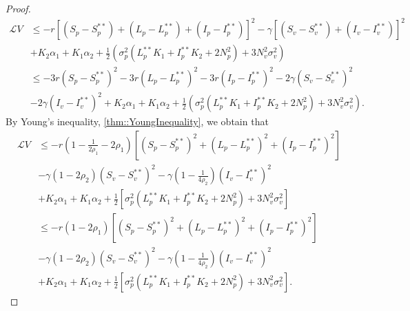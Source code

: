 \begin{proof}
	\begin{align*}
		\mathcal{L}V 
			&\leq 
				-r 
				\left[
					(S_p - S_p ^{**}) + 
					(L_p - L_p ^{**}) +
					(I_p - I_p ^{**})
				\right]^2 - 
				\gamma 
				\left[
					(S_v - S_v^{**}) + 
					(I_v - I_v^{**})
				\right] ^ 2
				\\
			&+
				K_2 \alpha_1 + 
				K_1 \alpha_2 + 
				\frac{1}{2}
				\left(
					\sigma_p ^2 
					(
						L_p ^{**} K_1 + 
						I_p ^{**} K_2 + 
						2 N_p ^ 2
					) + 3 N_v ^ 2 
					\sigma_v ^ 2
				\right)
				\\
			&\leq 
				-3r 
				(S_p - S_p ^{**}) ^ 2 - 
				3r 
				(L_p - L_p ^{**}) ^2 - 
				3r
				(I_p - I_p ^{**}) ^ 2 - 
				2 \gamma 
				(S_v - S_v^{**}) ^ 2 
				\\
			&- 
				2 \gamma 
				(I_v - I_v^{**}) ^ 2 
				+K_2 \alpha_1 + 
				K_1 \alpha_2 + 
				\frac{1}{2}
				\left(
					\sigma_p ^ 2
					(
						L_p ^{**} K_1 + 
						I_p ^{**} K_2 + 
						2N_p ^ 2
					) 
					+ 3 N_v ^ 2
					\sigma_v ^ 2
				\right).
	\end{align*}
	By Young's inequality, \autoref{thm::YoungInequality}, we obtain that
	\begin{align*}
	\mathcal{L} V 
		&\leq 
			-r
			\left(
				1 - 
				\frac{1}{2\rho_1} - 
				2 \rho_1 
			\right)
			\left[
				(S_p - S_p ^ {**}) ^ 2 + 
				(L_p - L_p ^ {**}) ^ 2 +
				(I_p - I_p ^ {**}) ^ 2
			\right]
			\\
			&-
				\gamma
				\left(
					1 - 2 
					\rho_2
				\right)
				(S_v - S_v^{**}) ^ 2 - 
				\gamma
				\left(
					1 - \frac{1}{4\rho_2}
				\right)
				(I_v - I_v^{**}) ^ 2
				\\
		&+
			K_2 \alpha_1 + 
			K_1 \alpha_2 + 
			\frac{1}{2}
			\left[
				\sigma_p ^ 2
				(
					L_p ^{**} K_1 + 
					I_p ^{**} K_2 + 
					2N_p ^ 2
				) + 
				3N_v ^ 2 
				\sigma_v ^ 2
			\right]
		\\
		&\leq 
			-r
			\left(
				1 - 2 \rho_1 
			\right)
			\left[
				(S_p - S_p ^{**}) ^ 2 + 
				(L_p - L_p ^{**}) ^ 2 + 
				(I_p - I_p ^{**}) ^ 2
			\right]
		\\
			&-
				\gamma
				\left( 
					1 - 2 \rho_2
				\right)
				(S_v - S_v^{**}) ^ 2 - 
				\gamma
				\left( 
					1 - \frac{1}{4\rho_2}\right)(I_v-I_v^{**})^2\\
			&+
				K_2 \alpha_1 + K_1
				\alpha_2 + 
				\frac{1}{2}
				\left[
					\sigma_p ^ 2
					(
						L_p ^{**} K_1 + 
						I_p ^{**} K_2 + 
						2 N_p ^ 2
					) + 
					3 N_v ^ 2
					\sigma_v ^ 2
					\right].
	\end{align*}

\end{proof}
